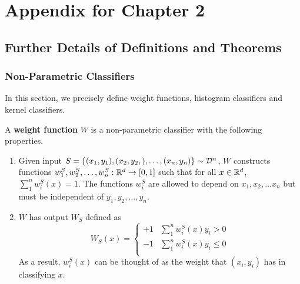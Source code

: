 \graphicspath{{./chapters/chapter1/}}
\chapter{Appendix for Chapter 2}

\section{Further Details of Definitions and Theorems}

\subsection{Non-Parametric Classifiers}

In this section, we precisely define weight functions, histogram classifiers and kernel classifiers.

\begin{defn} \label{def:weight_chap_1} 
\cite{devroye96} A \textbf{weight function} $W$ is a non-parametric classifier with the following properties.
\begin{enumerate}
	\item Given input $S = \{(x_1, y_1), (x_2, y_2,), \dots, (x_n, y_n)\} \sim {\mathcal D}^n$, $W$ constructs functions $w_1^S, w_2^S, \dots, w_n^S: \mathbb R^d \to [0, 1]$ such that for all $x \in \mathbb R^d$, $\sum_1^n w_i^S(x) = 1$. The functions $w_i^S$ are allowed to depend on $x_1, x_2, \dots x_n$ but must be independent of $y_1, y_2, \dots, y_n$. 
	\item $W$ has output $W_S$ defined as \[ W_S(x) = \begin{cases} 
      +1 & \sum_1^n w_i^S(x)y_i > 0 \\
      -1 & \sum_1^n w_i^S(x)y_i \leq 0 \\
   \end{cases}
\]
As a result, $w_i^S(x)$ can be thought of as the weight that $(x_i, y_i)$ has in classifying $x$.
\end{enumerate}
\end{defn}

